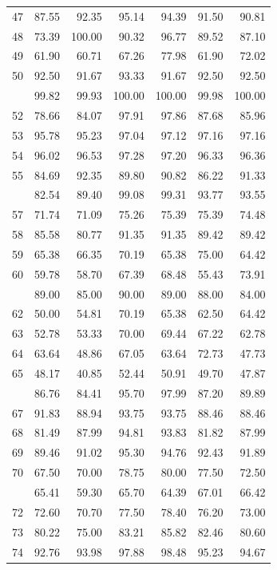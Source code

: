 \documentclass[]{elsarticle} %
\begin{document}
\begin{longtable}[t]{rrrrrrr}
47 & 87.55 & 92.35 & 95.14 & 94.39 & 91.50 & 90.81\\
48 & 73.39 & 100.00 & 90.32 & 96.77 & 89.52 & 87.10\\
49 & 61.90 & 60.71 & 67.26 & 77.98 & 61.90 & 72.02\\
50 & 92.50 & 91.67 & 93.33 & 91.67 & 92.50 & 92.50\\
\addlinespace
51 & 99.82 & 99.93 & 100.00 & 100.00 & 99.98 & 100.00\\
52 & 78.66 & 84.07 & 97.91 & 97.86 & 87.68 & 85.96\\
53 & 95.78 & 95.23 & 97.04 & 97.12 & 97.16 & 97.16\\
54 & 96.02 & 96.53 & 97.28 & 97.20 & 96.33 & 96.36\\
55 & 84.69 & 92.35 & 89.80 & 90.82 & 86.22 & 91.33\\
\addlinespace
56 & 82.54 & 89.40 & 99.08 & 99.31 & 93.77 & 93.55\\
57 & 71.74 & 71.09 & 75.26 & 75.39 & 75.39 & 74.48\\
58 & 85.58 & 80.77 & 91.35 & 91.35 & 89.42 & 89.42\\
59 & 65.38 & 66.35 & 70.19 & 65.38 & 75.00 & 64.42\\
60 & 59.78 & 58.70 & 67.39 & 68.48 & 55.43 & 73.91\\
\addlinespace
61 & 89.00 & 85.00 & 90.00 & 89.00 & 88.00 & 84.00\\
62 & 50.00 & 54.81 & 70.19 & 65.38 & 62.50 & 64.42\\
63 & 52.78 & 53.33 & 70.00 & 69.44 & 67.22 & 62.78\\
64 & 63.64 & 48.86 & 67.05 & 63.64 & 72.73 & 47.73\\
65 & 48.17 & 40.85 & 52.44 & 50.91 & 49.70 & 47.87\\
\addlinespace
66 & 86.76 & 84.41 & 95.70 & 97.99 & 87.20 & 89.89\\
67 & 91.83 & 88.94 & 93.75 & 93.75 & 88.46 & 88.46\\
68 & 81.49 & 87.99 & 94.81 & 93.83 & 81.82 & 87.99\\
69 & 89.46 & 91.02 & 95.30 & 94.76 & 92.43 & 91.89\\
70 & 67.50 & 70.00 & 78.75 & 80.00 & 77.50 & 72.50\\
\addlinespace
71 & 65.41 & 59.30 & 65.70 & 64.39 & 67.01 & 66.42\\
72 & 72.60 & 70.70 & 77.50 & 78.40 & 76.20 & 73.00\\
73 & 80.22 & 75.00 & 83.21 & 85.82 & 82.46 & 80.60\\
74 & 92.76 & 93.98 & 97.88 & 98.48 & 95.23 & 94.67\\

\end{longtable}
\end{document}
